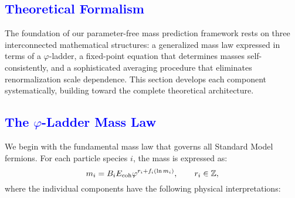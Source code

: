 \documentclass[%
amsmath,amssymb,
aps,
prb,
floatfix, showkeys, 10pt,
]{revtex4-2}
\newcommand{\modif}[1]{\textcolor{blue}{#1}}
\begin{document}
{\modif{ \section{Theoretical Formalism}
\label{sec:formalism} }}
The foundation of our parameter-free mass prediction framework rests on three interconnected mathematical structures: a generalized mass law expressed in terms of a $\varphi$-ladder, a fixed-point equation that determines masses self-consistently, and a sophisticated averaging procedure that eliminates renormalization scale dependence. This section develops each component systematically, building toward the complete theoretical architecture.





{\modif{ \subsection{The $\varphi$-Ladder Mass Law}
\label{subsec:mass-law}  }}
We begin with the fundamental mass law that governs all Standard Model fermions. For each particle species $i$, the mass is expressed as:
\begin{equation}
m_i = B_i E_{\rm coh} \varphi^{r_i + f_i(\ln m_i)}, \qquad r_i \in \mathbb{Z},
\label{eq:mass_law}
\end{equation}
where the individual components have the following physical interpretations:
\end{document}
